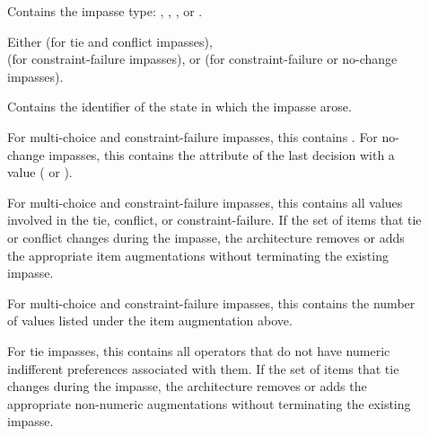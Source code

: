 \begin{description} 
\item [] 
	\vspace{-8pt} 
\item [] 
	Contains the impasse type: 
	, , , or .
	\vspace{-8pt} 
\item []
	Either  (for tie and conflict impasses), 
	 \\ (for constraint-failure impasses), or 
	 (for constraint-failure or no-change impasses).
	\vspace{-8pt} 
\item [] 
	Contains the identifier of the state in which the impasse arose.
	\vspace{-8pt}
\item [] 
	For multi-choice and constraint-failure impasses, this contains . For no-change impasses, this contains the attribute of the last decision with a value ( or ).
	\vspace{-8pt}
\item [] 
	For multi-choice and constraint-failure impasses, this contains all values involved in the tie, conflict, or constraint-failure. If the set of items that tie or conflict changes during the impasse, the architecture removes or adds the appropriate item augmentations without terminating the existing impasse.
	\vspace{-8pt}
\item [] 
	For multi-choice and constraint-failure impasses, this contains the number of values listed under the item augmentation above.
	\vspace{-8pt}
\item [] 
	For tie impasses, this contains all operators that do not have numeric indifferent preferences associated with them. If the set of items that tie changes during the impasse, the architecture removes or adds the appropriate non-numeric augmentations without terminating the existing impasse.

\end{description}
